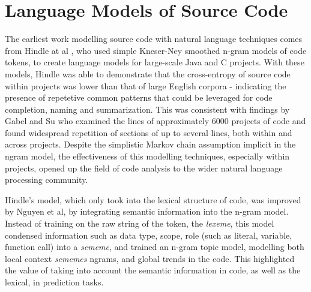 
\section{Language Models of Source Code}

The earliest work modelling source code with natural language techniques comes from Hindle at al \cite{Hindle:2012:NS:2337223.2337322}, who used simple Kneser-Ney smoothed n-gram models of code tokens, to create language models for large-scale Java and C projects.
With these models, Hindle was able to demonstrate that the cross-entropy of source code within projects was lower than that of large English corpora - indicating the presence of repetetive common patterns that could be leveraged for code completion, naming and summarization.
This was consistent with findings by Gabel and Su \cite{gabel_study_2010} who examined the lines of approximately 6000 projects of code and found widespread repetition of sections of up to several lines, both within and across projects.
Despite the simplistic Markov chain assumption implicit in the ngram model, the effectiveness of this modelling techniques, especially within projects, opened up the field of code analysis to the wider natural language processing community.

Hindle's model, which only took into the lexical structure of code, was improved by Nguyen et al\cite{nguyen_statistical_2013}, by integrating semantic information into the n-gram model.
Instead of training on the raw string of the token, the \textit{lexeme}, this model condensed information such as data type, scope, role (such as literal, variable, function call) into a \textit{sememe}, and trained an n-gram topic model, modelling both local context \textit{sememes} ngrams, and global trends in the code.
This highlighted the value of taking into account the semantic information in code, as well as the lexical, in prediction tasks.

